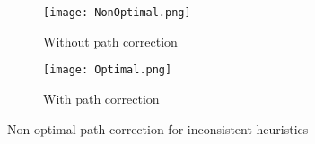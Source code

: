 \documentclass[conference]{IEEEtran}
\begin{document}
\begin{figure*}
    \begin{subfigure}{.48\textwidth}
        \texttt{[image: NonOptimal.png]}
        \caption{Without path correction}
        \label{fig:NONOP}
    \end{subfigure} \hfill
    \begin{subfigure}{.48\textwidth}
        \texttt{[image: Optimal.png]}
        \caption{With path correction}
        \label{fig:OP}
    \end{subfigure} \hfill
    \caption{Non-optimal path correction for inconsistent heuristics}    
    \label{fig:NonConsistent}
\end{figure*}
\end{document}
